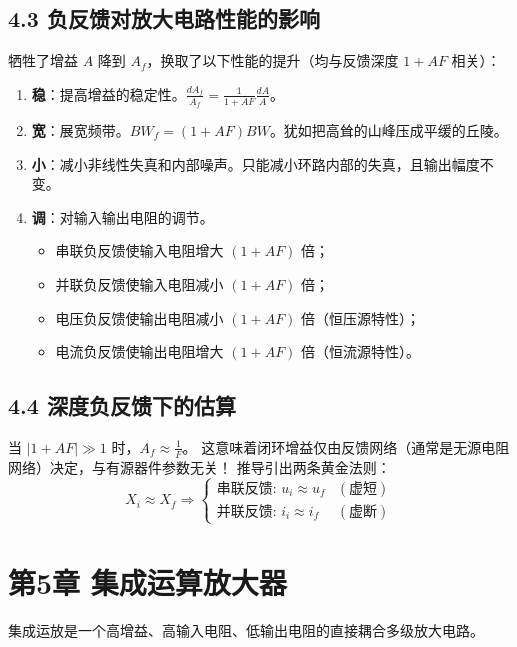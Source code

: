 \documentclass[12pt,a4paper]{ctexart}
\begin{document}
	\subsection*{4.3 负反馈对放大电路性能的影响}
	\begin{tipbox}
		牺牲了增益 $A$ 降到 $A_f$，换取了以下性能的提升（均与反馈深度 $1+AF$ 相关）：
		\begin{enumerate}
			\item \textbf{稳}：提高增益的稳定性。$\frac{dA_f}{A_f} = \frac{1}{1+AF}\frac{dA}{A}$。
			\item \textbf{宽}：展宽频带。$BW_f = (1+AF)BW$。犹如把高耸的山峰压成平缓的丘陵。
			\item \textbf{小}：减小非线性失真和内部噪声。只能减小环路内部的失真，且输出幅度不变。
			\item \textbf{调}：对输入输出电阻的调节。
			\begin{itemize}
				\item 串联负反馈使输入电阻增大 $(1+AF)$ 倍；
				\item 并联负反馈使输入电阻减小 $(1+AF)$ 倍；
				\item 电压负反馈使输出电阻减小 $(1+AF)$ 倍（恒压源特性）；
				\item 电流负反馈使输出电阻增大 $(1+AF)$ 倍（恒流源特性）。
			\end{itemize}
		\end{enumerate}
	\end{tipbox}
	\subsection*{4.4 深度负反馈下的估算}
	当 $|1+AF| \gg 1$ 时，$A_f \approx \frac{1}{F}$。
	这意味着闭环增益仅由反馈网络（通常是无源电阻网络）决定，与有源器件参数无关！
	推导引出两条黄金法则：
	$$ X_i \approx X_f \Rightarrow \begin{cases} \text{串联反馈: } u_i \approx u_f & (\text{虚短}) \\ \text{并联反馈: } i_i \approx i_f & (\text{虚断}) \end{cases} $$
	\clearpage
	\section*{第5章 集成运算放大器}
	集成运放是一个高增益、高输入电阻、低输出电阻的直接耦合多级放大电路。
\end{document}
